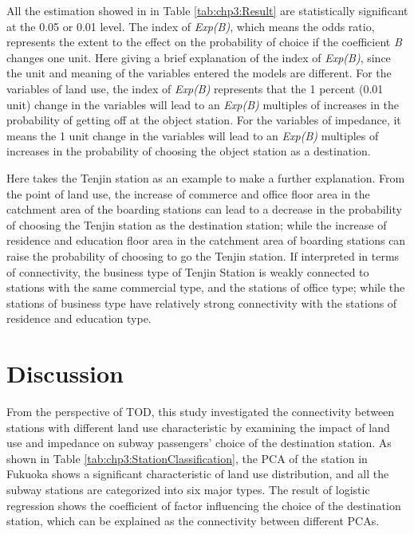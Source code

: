 %
All the estimation showed in in Table \ref{tab:chp3:Result} are statistically significant at the 0.05 or 0.01 level. The index of \textsl{Exp(B)}, which means the odds ratio, represents the extent to the effect on the probability of choice if the coefficient \textsl{B} changes one unit. Here giving a brief explanation of the index of \textsl{Exp(B)}, since the unit and meaning of the variables entered the models are different. For the variables of land use, the index of \textsl{Exp(B)} represents that the 1 percent (0.01 unit) change in the variables will lead to an \textsl{Exp(B)} multiples of increases in the probability of getting off at the object station. For the variables of impedance, it means the 1 unit change in the variables will lead to an \textsl{Exp(B)} multiples of increases in the probability of choosing the object station as a destination. 

%
Here takes the Tenjin station as an example to make a further explanation. From the point of land use, the increase of commerce and office floor area in the catchment area of the boarding stations can lead to a decrease in the probability of choosing the Tenjin station as the destination station; while the increase of residence and education floor area in the catchment area of boarding stations can raise the probability of choosing to go the Tenjin station. If interpreted in terms of connectivity, the business type of Tenjin Station is weakly connected to stations with the same commercial type, and the stations of office type; while the stations of business type have relatively strong connectivity with the stations of residence and education type.

%
\section{Discussion}
%
From the perspective of TOD, this study investigated the connectivity between stations with different land use characteristic by examining the impact of land use and impedance on subway passengers' choice of the destination station. As shown in Table \ref{tab:chp3:StationClassification}, the PCA of the station in Fukuoka shows a significant characteristic of land use distribution, and all the subway stations are categorized into six major types. The result of logistic regression shows the coefficient of factor influencing the choice of the destination station, which can be explained as the connectivity between different PCAs.

